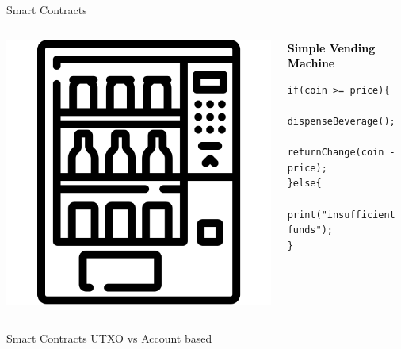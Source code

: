 \documentclass[handout]{beamer}
\begin{document}
\begin{frame}[fragile]{Smart Contracts}
	\begin{columns}
		\begin{column}{0.3\textwidth}
			\includegraphics[width=1\textwidth]{../assets/images/vending-machine.png}
		\end{column}
		\begin{column}{0.5\textwidth}
			\begin{block}{\textcolor{black}{\textbf{Simple Vending Machine}}}
				\begin{lstlisting}[firstnumber=1,  xleftmargin=0pt, columns=fullflexible,language=Solidity] 
if(coin >= price){
	dispenseBeverage();
	returnChange(coin - price);
}else{
	print("insufficient funds");
}
				\end{lstlisting}
			\end{block}
		\end{column}
	\end{columns}
	\vspace{0.5cm}
\end{frame}


\begin{frame}{Smart Contracts}
	UTXO vs Account based
\end{frame}


%	
%	

\end{document}
